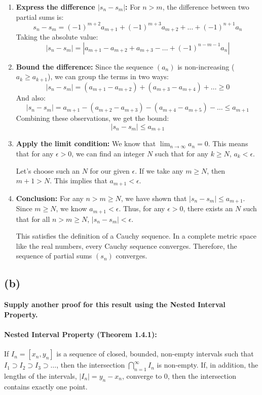 \documentclass[12pt,a4paper]{article}
\theoremstyle{definition}
\theoremstyle{remark}
\begin{document}
\begin{enumerate}
    \item \textbf{Express the difference $|s_n - s_m|$:}
    For $n > m$, the difference between two partial sums is:
    \[ s_n - s_m = (-1)^{m+2}a_{m+1} + (-1)^{m+3}a_{m+2} + \dots + (-1)^{n+1}a_n \]
    Taking the absolute value:
    \[ |s_n - s_m| = |a_{m+1} - a_{m+2} + a_{m+3} - \dots + (-1)^{n-m-1}a_n| \]

    \item \textbf{Bound the difference:}
    Since the sequence $(a_n)$ is non-increasing ($a_k \ge a_{k+1}$), we can group the terms in two ways:
    \[ |s_n - s_m| = (a_{m+1} - a_{m+2}) + (a_{m+3} - a_{m+4}) + \dots \ge 0 \]
    And also:
    \[ |s_n - s_m| = a_{m+1} - (a_{m+2} - a_{m+3}) - (a_{m+4} - a_{m+5}) - \dots \le a_{m+1} \]
    Combining these observations, we get the bound:
    \[ |s_n - s_m| \le a_{m+1} \]

    \item \textbf{Apply the limit condition:}
    We know that $\lim_{n\to\infty} a_n = 0$. This means that for any $\epsilon > 0$, we can find an integer $N$ such that for any $k \ge N$, $a_k < \epsilon$.

    Let's choose such an $N$ for our given $\epsilon$. If we take any $m \ge N$, then $m+1 > N$. This implies that $a_{m+1} < \epsilon$.

    \item \textbf{Conclusion:}
    For any $n > m \ge N$, we have shown that $|s_n - s_m| \le a_{m+1}$. Since $m \ge N$, we know $a_{m+1} < \epsilon$.
    Thus, for any $\epsilon > 0$, there exists an $N$ such that for all $n > m \ge N$, $|s_n - s_m| < \epsilon$.

    This satisfies the definition of a Cauchy sequence. In a complete metric space like the real numbers, every Cauchy sequence converges. Therefore, the sequence of partial sums $(s_n)$ converges.
\end{enumerate}

\subsection*{(b)}
\textbf{Supply another proof for this result using the Nested Interval Property.}

\paragraph{Nested Interval Property (Theorem 1.4.1):}
If $I_n = [x_n, y_n]$ is a sequence of closed, bounded, non-empty intervals such that $I_1 \supset I_2 \supset I_3 \supset \dots$, then the intersection $\bigcap_{n=1}^{\infty} I_n$ is non-empty. If, in addition, the lengths of the intervals, $|I_n| = y_n - x_n$, converge to 0, then the intersection contains exactly one point.
\end{document}
